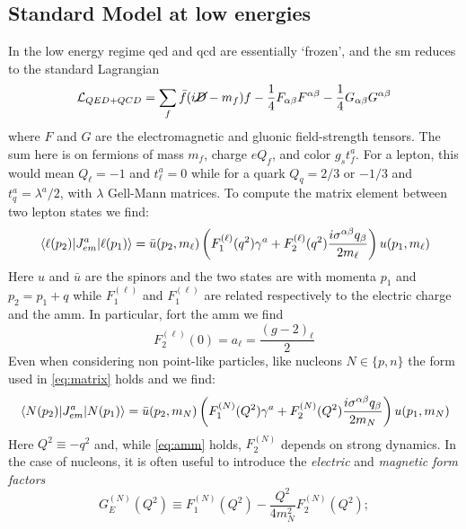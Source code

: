 \begin{refsection}
    \subsection{Standard Model at low energies}
        In the low energy regime \gls{qed} and \gls{qcd} are essentially `frozen', and the \gls{sm} reduces to the standard Lagrangian
        \begin{equation}
            \mathcal{L}_{QED+QCD}=\sum_{f}\bar{f}(i\cancel{D}-m_f)f-\frac{1}{4}F_{\alpha\beta}F^{\alpha\beta}-\frac{1}{4}G_{\alpha\beta}G^{\alpha\beta}
            \label{eq:sm}
        \end{equation}
        where $F$ and $G$ are the electromagnetic and gluonic field-strength tensors. The sum here is on fermions of mass $m_f$, charge $eQ_f$, and color $g_st^a_f$. For a lepton, this would mean $Q_\ell=-1$ and $t^a_\ell=0$ while for a quark $Q_q=2/3$ or $-1/3$ and $t^a_q=\lambda^a/2$, with $\lambda$ Gell-Mann matrices.
        To compute the matrix element between two lepton states we find:
        \begin{equation}
            \matrixel{\ell(p_2)}{J^a_{em}}{\ell(p_1)} =\bar{u}(p_2,m_\ell)\left(F^{(\ell)}_1(q^2)\gamma^a+F^{(\ell)}_2(q^2)\frac{i\sigma^{\alpha\beta}q_\beta}{2m_\ell} \right)u(p_1,m_\ell)
            \label{eq:matrix}
        \end{equation}
        Here $u$ and $\bar{u}$ are the spinors and the two states are with momenta $p_1$ and $p_2=p_1+q$ while $F_1^{(\ell)}$ and $F_1^{(\ell)}$ are related respectively to the electric charge and the \gls{amm}. 
        In particular, fort the \gls{amm} we find  
        \begin{equation}
            F_2^{(\ell)}(0) = a_\ell = \frac{(g-2)_\ell}{2}  
            \label{eq:amm}
        \end{equation}
        Even when considering non point-like particles, like nucleons $N\in \{p,n\}$ the form used in \ref{eq:matrix} holds and we find:
        \begin{equation}
            \matrixel{N(p_2)}{J^a_{em}}{N(p_1)} =\bar{u}(p_2,m_N)\left(F^{(N)}_1(Q^2)\gamma^a+F^{(N)}_2(Q^2)\frac{i\sigma^{\alpha\beta}q_\beta}{2m_N} \right)u(p_1,m_N)
        \end{equation}
        Here $Q^2\equiv -q^2$ and, while \ref{eq:amm} holds, $F_2^{(N)}$ depends on strong dynamics.
        In the case of nucleons, it is often useful to introduce the \textit{electric} and \textit{magnetic form factors}
        \begin{equation*}
            G^{(N)}_E(Q^2)\equiv F_1^{(N)}(Q^2)-\frac{Q^2}{4m_N^2}F_2^{(N)}(Q^2);

\end{equation*}
\end{refsection}
